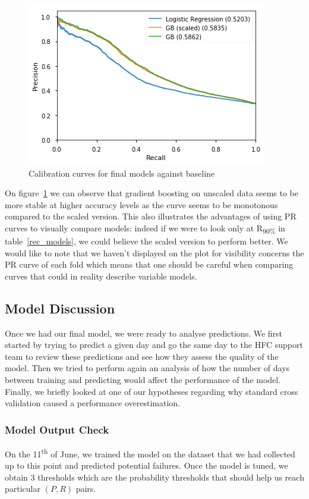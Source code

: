 \begin{figure}[ht]
    \begin{center}
    \includegraphics[width=0.6\linewidth]{images/model_comparison}
    \end{center}
	\caption{Calibration curves for final models against baseline}
    \label{model_comparison}
\end{figure}

On figure~\ref{model_comparison} we can observe that gradient boosting on unscaled data seems to be more stable at higher accuracy levels as the curve seems to be monotonous compared to the scaled version. This also illustrates the advantages of using PR curves to visually compare models: indeed if we were to look only at R\textsubscript{90\%} in table~\ref{rec_models}, we could believe the scaled version to perform better. We would like to note that we haven't displayed on the plot for visibility concerns the PR curve of each fold which means that one should be careful when comparing curves that could in reality describe variable models. 

\subsection{Model Discussion}
Once we had our final model, we were ready to analyse predictions. We first started by trying to predict a given day and go the same day to the HFC support team to review these predictions and see how they assess the quality of the model. Then we tried to perform again an analysis of how the number of days between training and predicting would affect the performance of the model. Finally, we briefly looked at one of our hypotheses regarding why standard cross validation caused a performance overestimation.

\subsubsection{Model Output Check}
On the 11\textsuperscript{th} of June, we trained the model on the dataset that we had collected up to this point and predicted potential failures. Once the model is tuned, we obtain 3 thresholds which are the probability thresholds that should help us reach particular $(P,R)$ pairs. 

